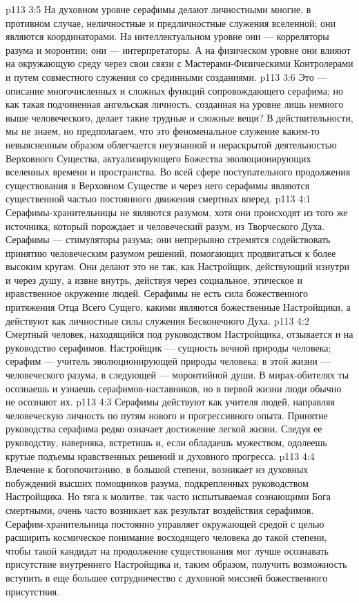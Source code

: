 \vs p113 3:5 На духовном уровне серафимы делают личностными многие, в противном случае, неличностные и предличностные служения вселенной; они являются координаторами. На интеллектуальном уровне они --- корреляторы разума и моронтии; они --- интерпретаторы. А на физическом уровне они влияют на окружающую среду через свои связи с Мастерами\hyp{}Физическими Контролерами и путем совместного служения со срединными созданиями.
\vs p113 3:6 Это --- описание многочисленных и сложных функций сопровождающего серафима; но как такая подчиненная ангельская личность, созданная на уровне лишь немного выше человеческого, делает такие трудные и сложные вещи? В действительности, мы не знаем, но предполагаем, что это феноменальное служение каким\hyp{}то невыясненным образом облегчается неузнанной и нераскрытой деятельностью Верховного Существа, актуализирующего Божества эволюционирующих вселенных времени и пространства. Во всей сфере поступательного продолжения существования в Верховном Существе и через него серафимы являются существенной частью постоянного движения смертных вперед.
\vs p113 4:1 Серафимы\hyp{}хранительницы не являются разумом, хотя они происходят из того же источника, который порождает и человеческий разум, из Творческого Духа. Серафимы --- стимуляторы разума; они непрерывно стремятся содействовать принятию человеческим разумом решений, помогающих продвигаться к более высоким кругам. Они делают это не так, как Настройщик, действующий изнутри и через душу, а извне внутрь, действуя через социальное, этическое и нравственное окружение людей. Серафимы не есть сила божественного притяжения Отца Всего Сущего, какими являются божественные Настройщики, а действуют как личностные силы служения Бесконечного Духа.
\vs p113 4:2 Смертный человек, находящийся под руководством Настройщика, отзывается и на руководство серафимов. Настройщик --- сущность вечной природы человека; серафим --- учитель эволюционирующей природы человека: в этой жизни --- человеческого разума, в следующей --- моронтийной души. В мирах\hyp{}обителях ты осознаешь и узнаешь серафимов\hyp{}наставников, но в первой жизни люди обычно не осознают их.
\vs p113 4:3 Серафимы действуют как учителя людей, направляя человеческую личность по путям нового и прогрессивного опыта. Принятие руководства серафима редко означает достижение легкой жизни. Следуя ее руководству, наверняка, встретишь и, если обладаешь мужеством, одолеешь крутые подъемы нравственных решений и духовного прогресса.
\vs p113 4:4 Влечение к богопочитанию, в большой степени, возникает из духовных побуждений высших помощников разума, подкрепленных руководством Настройщика. Но тяга к молитве, так часто испытываемая сознающими Бога смертными, очень часто возникает как результат воздействия серафимов. Серафим\hyp{}хранительница постоянно управляет окружающей средой с целью расширить космическое понимание восходящего человека до такой степени, чтобы такой кандидат на продолжение существования мог лучше осознавать присутствие внутреннего Настройщика и, таким образом, получить возможность вступить в еще большее сотрудничество с духовной миссией божественного присутствия.
